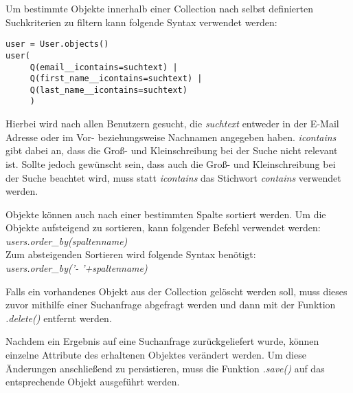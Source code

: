 Um bestimmte Objekte innerhalb einer Collection nach selbst definierten Suchkriterien zu filtern kann folgende Syntax verwendet werden:

\begin{lstlisting}[caption=Syntax für eine Suchanfrage an die Datenbank in Django]
user = User.objects()
user(
     Q(email__icontains=suchtext) | 	 
     Q(first_name__icontains=suchtext) | 
     Q(last_name__icontains=suchtext)
     )
\end{lstlisting}

Hierbei wird nach allen Benutzern gesucht, die \textit{suchtext} entweder in der E-Mail Adresse oder im Vor- beziehungsweise Nachnamen angegeben haben. \textit{icontains} gibt dabei an, dass die Groß- und Kleinschreibung bei der Suche nicht relevant ist. Sollte jedoch gewünscht sein, dass auch die Groß- und Kleinschreibung bei der Suche beachtet wird, muss statt \textit{icontains} das Stichwort \textit{contains} verwendet werden.

Objekte können auch nach einer bestimmten Spalte sortiert werden. Um die Objekte aufsteigend zu sortieren, kann folgender Befehl verwendet werden:\\
\textit{users.order\_by(spaltenname)}\\
Zum absteigenden Sortieren wird folgende Syntax benötigt:\\
\textit{users.order\_by('- '+spaltenname)}

Falls ein vorhandenes Objekt aus der Collection gelöscht werden soll, muss dieses zuvor mithilfe einer Suchanfrage abgefragt werden und dann mit der Funktion \textit{.delete()} entfernt werden. 

Nachdem ein Ergebnis auf eine Suchanfrage zurückgeliefert wurde, können einzelne Attribute des erhaltenen Objektes verändert werden. Um diese Änderungen anschließend zu persistieren, muss die Funktion \textit{.save()} auf das entsprechende Objekt ausgeführt werden.
